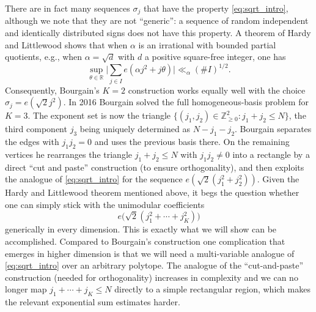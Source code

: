 \documentclass[a4paper,reqno,12pt]{amsart}
\theoremstyle{plain}
\theoremstyle{plain}
\theoremstyle{remark}
\theoremstyle{plain}
\newcommand{\z}{\mathbb{Z}}
\newcommand{\RR}{\mathbb{R}}
\newcommand{\si}{\sigma}
\theoremstyle{plain}
\theoremstyle{plain}
\begin{document}
{There are in fact many sequences $\si_j$ that have the property \eqref{eq:sqrt_intro}, although we note that they are not ``generic'': a sequence of random independent and identically distributed signs does not have this property. A theorem of Hardy and Littlewood \cite[Theorems~2.141 and~2.181]{HL} shows that when $\alpha$ is an irrational with bounded partial quotients, e.g., when $\alpha = \sqrt{d}$ with $d$ a positive square-free integer, one has
\[
 \sup_{\theta\in\RR}
 \bigg|\sum_{j\in I}e(\alpha j^2+j\theta)\bigg|
 \ll_\alpha(\#I)^{1/2}.
\]
Consequently, Bourgain's $K=2$ construction works equally well with the choice $\sigma_j=e(\sqrt{2} j^2)$.  {In 2016 Bourgain}  \cite{Bour2} solved the full homogeneous-basis problem for $K=3$.  The exponent set is now the triangle $\{(j_1,j_2)\in\z_{\geq0}^2:j_1+j_2\leq N\}$, the third component $j_3$ being uniquely determined as $N - j_1 - j_2$.
Bourgain separates the edges with $j_1j_2=0$ and uses the previous basis there. On the remaining vertices he rearranges the triangle $j_1 + j_2 \leq N$ with $j_1 j_2 \neq 0$ into a rectangle by a direct ``cut and paste'' construction (to ensure orthogonality), and then exploits the analogue of \eqref{eq:sqrt_intro} for the sequence $e(\sqrt{2} (j_1^2 + j_2^2))$. Given the Hardy and Littlewood theorem mentioned above, it begs the question whether one can simply stick with the unimodular coefficients 
\[
e\bigl(\sqrt{2} (j_1^2 +\cdots+j_K^2)\bigr)
\]
generically in every dimension. {This is exactly what we will show can be accomplished.} Compared to Bourgain's construction one complication that emerges in higher dimension is that we will need a multi-variable analogue of \eqref{eq:sqrt_intro} over an arbitrary polytope. The analogue of the ``cut-and-paste'' construction (needed for orthogonality) increases in complexity and we can no longer map $j_1 + \cdots + j_K \leq N$ directly to a simple rectangular region, which makes the relevant exponential sum estimates harder. 

}
\end{document}
